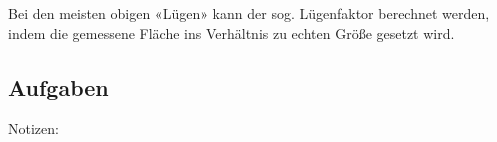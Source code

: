Bei den meisten obigen «Lügen» kann der sog. Lügenfaktor berechnet werden, indem die gemessene Fläche ins Verhältnis zu echten Größe gesetzt wird.
\newpage


\subsection*{Aufgaben}

Notizen:



\newpage
